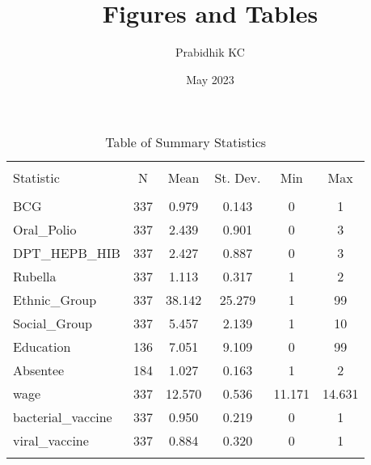 \documentclass{article}
\title{Figures and Tables}
\author{Prabidhik KC}
\date{May 2023}
\begin{document}
\maketitle

\begin{table}[!htbp] \centering 
  \caption{Table of Summary Statistics} 
  \label{} 
\begin{tabular}{@{\extracolsep{5pt}}lccccc} 
\\[-1.8ex]\hline 
\hline \\[-1.8ex] 
Statistic & \multicolumn{1}{c}{N} & \multicolumn{1}{c}{Mean} & \multicolumn{1}{c}{St. Dev.} & \multicolumn{1}{c}{Min} & \multicolumn{1}{c}{Max} \\ 
\hline \\[-1.8ex] 
BCG & 337 & 0.979 & 0.143 & 0 & 1 \\ 
Oral\_Polio & 337 & 2.439 & 0.901 & 0 & 3 \\ 
DPT\_HEPB\_HIB & 337 & 2.427 & 0.887 & 0 & 3 \\ 
Rubella & 337 & 1.113 & 0.317 & 1 & 2 \\ 
Ethnic\_Group & 337 & 38.142 & 25.279 & 1 & 99 \\ 
Social\_Group & 337 & 5.457 & 2.139 & 1 & 10 \\ 
Education & 136 & 7.051 & 9.109 & 0 & 99 \\ 
Absentee & 184 & 1.027 & 0.163 & 1 & 2 \\ 
wage & 337 & 12.570 & 0.536 & 11.171 & 14.631 \\ 
bacterial\_vaccine & 337 & 0.950 & 0.219 & 0 & 1 \\ 
viral\_vaccine & 337 & 0.884 & 0.320 & 0 & 1 \\ 
\hline \\[-1.8ex] 
\end{tabular} 
\end{table} 
\end{document}
